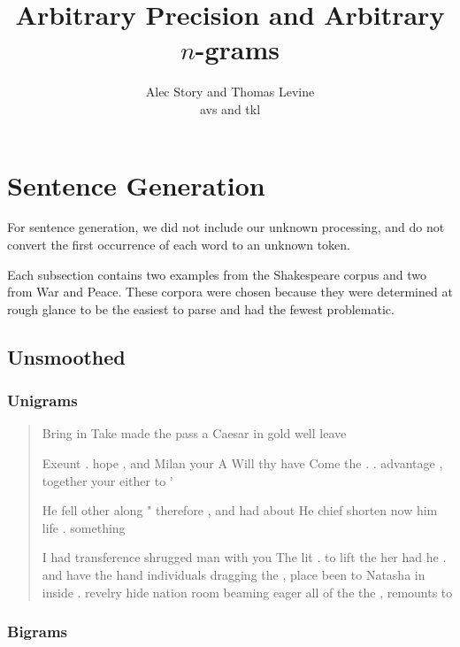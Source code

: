 \documentclass{article}
\title{Arbitrary Precision and Arbitrary $n$-grams}
\author{Alec Story and Thomas Levine\\\small{avs\osn{38} and tkl\osn{22}}}
\begin{document}
\maketitle
\section*{Sentence Generation}
	
	For sentence generation, we did not include our unknown processing, and do
	not convert the first occurrence of each word to an unknown token.

	Each subsection contains two examples from the Shakespeare corpus and two
	from War and Peace.  These corpora were chosen because they were determined
	at rough glance to be the easiest to parse and had the fewest problematic.

	\subsection*{Unsmoothed}

		\subsubsection*{Unigrams}

			\begin{quote}

			Bring in Take made the pass a Caesar in gold well leave

			Exeunt . hope , and Milan your A Will thy have Come the . .
			advantage , together your either to '

			He fell other along " therefore , and had about He chief shorten now
			him life . something

			I had transference shrugged man with you The lit . to lift the her
			had he . and have the hand individuals dragging the , place been to
			Natasha in inside . revelry hide nation room beaming eager all of
			the the , remounts to

			\end{quote}

		\subsubsection*{Bigrams}
\end{document}
